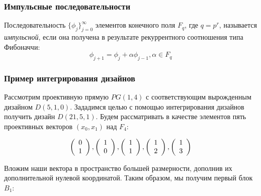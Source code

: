 \documentclass[12pt]{article}
\begin{document}
\subsubsection{Импульсные последовательности}
Последовательность $\{\phi_j\}^\infty_{j=0}$ элементов конечного поля $F_q$, где $q = p^r$, называется \textit{импульсной}, если она получена в результате рекуррентного соотношения типа Фибоначчи:
$$\phi_{j+1} = \phi_j + \alpha\phi_{j-1}, \alpha \in F_q$$

\subsubsection{Пример интегрирования дизайнов}
Рассмотрим проективную прямую $PG(1,4)$ с соответствующим вырожденным дизайном $D(5,1,0)$. Зададимся целью с помощью интегрирования дизайнов получить дизайн $D(21,5,1)$. 
Будем рассматривать в качестве элементов пять проективных векторов $(x_0, x_1)$ над $F_4$:

$$
\left( {\begin{array}{*{20}c}
   0  \\
   1  \\    
 \end{array} } \right),
 \left( {\begin{array}{*{20}c}
   1  \\
   0  \\    
 \end{array} } \right),
 \left( {\begin{array}{*{20}c}
   1  \\
   1  \\    
 \end{array} } \right),
 \left( {\begin{array}{*{20}c}
   1  \\
   2  \\    
 \end{array} } \right),
 \left( {\begin{array}{*{20}c}
   1  \\
   3  \\    
 \end{array} } \right)
$$

Вложим наши вектора в пространство большей размерности, дополнив их дополнительной нулевой координатой. Таким образом, мы получим первый блок $B_1$:
\end{document}
